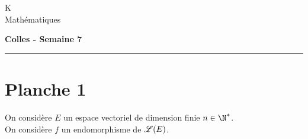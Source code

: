 \documentclass[11pt]{article}%
\begin{document}
\begin{flushleft}
K \\
Mathématiques
\end{flushleft}

\begin{center}
\textbf{\Large{Colles - Semaine 7}}
\end{center}

\hrule

\vspace*{0,2cm}

\section*{Planche 1}

\noindent
  On considère $E$ un espace vectoriel de dimension finie $n \in
  \N^*$.\\
  On considère $f$ un endomorphisme de $\mathscr{L}(E)$.
\end{document}

